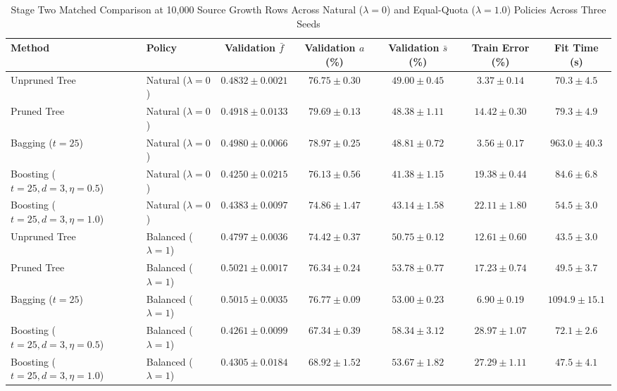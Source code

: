 \begin{table}[!t]
\centering
\caption{Stage Two Matched Comparison at 10,000 Source Growth Rows Across Natural ($\lambda=0$) and Equal-Quota ($\lambda=1.0$) Policies Across Three Seeds}
\label{tab:10k_comparison}
\footnotesize
\setlength{\tabcolsep}{2.5pt}
\begin{tabular}{llccccc}
\toprule
\textbf{Method} & \textbf{Policy} & \textbf{Validation $\bar{f}$} & \textbf{Validation $a$ (\%)} & \textbf{Validation $\bar{s}$ (\%)} & \textbf{Train Error (\%)} & \textbf{Fit Time (s)} \\
\midrule
Unpruned Tree                   & Natural ($\lambda=0$)  & $0.4832 \pm 0.0021$ & $76.75 \pm 0.30$ & $49.00 \pm 0.45$ & $3.37 \pm 0.14$  &   $70.3 \pm 4.5$ \\
Pruned Tree                     & Natural ($\lambda=0$)  & $0.4918 \pm 0.0133$ & $\mathbf{79.69 \pm 0.13}$ & $48.38 \pm 1.11$ & $14.42 \pm 0.30$ &   $79.3 \pm 4.9$ \\
Bagging ($t=25$)                & Natural ($\lambda=0$)  & $0.4980 \pm 0.0066$ & $78.97 \pm 0.25$ & $48.81 \pm 0.72$ & $3.56 \pm 0.17$  &  $963.0 \pm 40.3$ \\
Boosting ($t=25, d=3, \eta=0.5$)& Natural ($\lambda=0$)  & $0.4250 \pm 0.0215$ & $76.13 \pm 0.56$ & $41.38 \pm 1.15$ & $19.38 \pm 0.44$ &   $84.6 \pm 6.8$ \\
Boosting ($t=25, d=3, \eta=1.0$)& Natural ($\lambda=0$)  & $0.4383 \pm 0.0097$ & $74.86 \pm 1.47$ & $43.14 \pm 1.58$ & $22.11 \pm 1.80$ &   $54.5 \pm 3.0$ \\
\midrule
Unpruned Tree                   & Balanced ($\lambda=1$) & $0.4797 \pm 0.0036$ & $74.42 \pm 0.37$ & $50.75 \pm 0.12$ & $12.61 \pm 0.60$ &   $43.5 \pm 3.0$ \\
Pruned Tree                     & Balanced ($\lambda=1$) & $\mathbf{0.5021 \pm 0.0017}$ & $76.34 \pm 0.24$ & $53.78 \pm 0.77$ & $17.23 \pm 0.74$ &   $49.5 \pm 3.7$ \\
Bagging ($t=25$)                & Balanced ($\lambda=1$) & $0.5015 \pm 0.0035$ & $76.77 \pm 0.09$ & $53.00 \pm 0.23$ & $6.90 \pm 0.19$  & $1094.9 \pm 15.1$ \\
Boosting ($t=25, d=3, \eta=0.5$)& Balanced ($\lambda=1$) & $0.4261 \pm 0.0099$ & $67.34 \pm 0.39$ & $\mathbf{58.34 \pm 3.12}$ & $28.97 \pm 1.07$ &   $72.1 \pm 2.6$ \\
Boosting ($t=25, d=3, \eta=1.0$)& Balanced ($\lambda=1$) & $0.4305 \pm 0.0184$ & $68.92 \pm 1.52$ & $53.67 \pm 1.82$ & $27.29 \pm 1.11$ &   $47.5 \pm 4.1$ \\
\bottomrule
\end{tabular}
\end{table}

